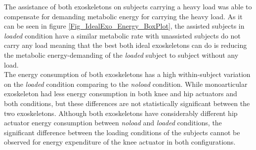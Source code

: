 \documentclass[10pt,letterpaper]{article}
\begin{document}
The assistance of both exoskeletons on subjects carrying a heavy load was able to compensate for demanding metabolic energy for carrying the heavy load. As it can be seen in figure \ref{Fig_IdealExo_Energy_BoxPlot}, the assisted subjects in \textit{loaded} condition have a similar metabolic rate with unassisted subjects do not carry any load meaning that the best both ideal exoskeletons can do is reducing the metabolic energy-demanding of the \textit{loaded} subject to subject without any load.\\
The energy consumption of both exoskeletons has a high within-subject variation on the \textit{loaded} condition comparing to the \textit{noload} condition. While monoarticular exoskeleton had less energy consumption in both knee and hip actuators and both conditions, but these differences are not statistically significant between the two exoskeletons.  Although both exoskeletons have considerably different hip actuator energy consumption between \textit{noload} and \textit{loaded} conditions, the significant difference between the loading conditions of the subjects cannot be observed for energy expenditure of the knee actuator in both configurations.\\
\end{document}
